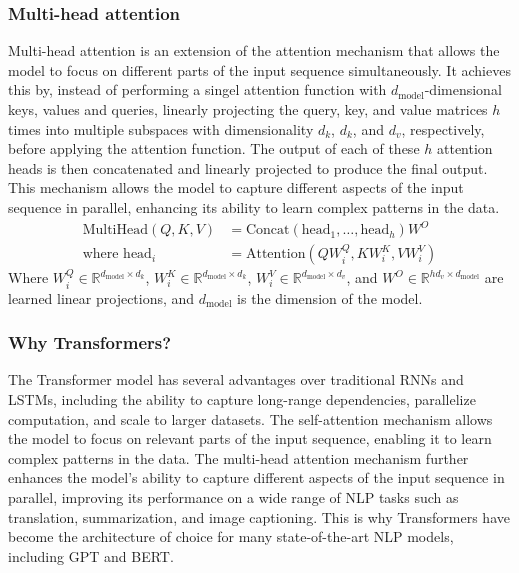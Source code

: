             \subsubsection{Multi-head attention}
                Multi-head attention is an extension of the attention mechanism that allows the model to focus on different parts of the input sequence simultaneously. It achieves this by, instead of performing a singel attention function with \(d_{\text{model}}\)-dimensional keys, values and queries, linearly projecting the query, key, and value matrices \(h\) times into multiple subspaces with dimensionality \(d_k\), \(d_k\), and \(d_v\), respectively, before applying the attention function. The output of each of these \(h\) attention heads is then concatenated and linearly projected to produce the final output. This mechanism allows the model to capture different aspects of the input sequence in parallel, enhancing its ability to learn complex patterns in the data.
                \begin{align}
                    \text{MultiHead}(Q, K, V) &= \text{Concat}(\text{head}_1, \ldots, \text{head}_h)W^O \\
                    \text{where head}_i &= \text{Attention}(QW_i^Q, KW_i^K, VW_i^V)
                \end{align}
                Where \(W_i^Q \in \mathbb{R}^{d_{\text{model}} \times d_k}\), \(W_i^K \in \mathbb{R}^{d_{\text{model}} \times d_k}\), \(W_i^V \in \mathbb{R}^{d_{\text{model}} \times d_v}\), and \(W^O \in \mathbb{R}^{hd_v \times d_{\text{model}}}\) are learned linear projections, and \(d_{\text{model}}\) is the dimension of the model.

            \subsubsection{Why Transformers?}
                The Transformer model has several advantages over traditional RNNs and LSTMs, including the ability to capture long-range dependencies, parallelize computation, and scale to larger datasets. The self-attention mechanism allows the model to focus on relevant parts of the input sequence, enabling it to learn complex patterns in the data. The multi-head attention mechanism further enhances the model's ability to capture different aspects of the input sequence in parallel, improving its performance on a wide range of NLP tasks such as translation, summarization, and image captioning. This is why Transformers have become the architecture of choice for many state-of-the-art NLP models, including GPT and BERT.

